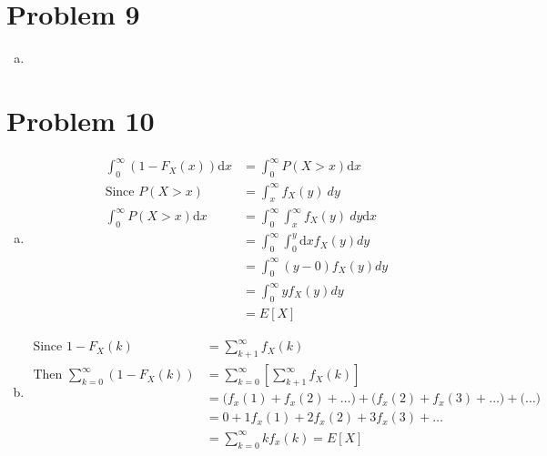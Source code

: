 \documentclass{article}
\newcommand{\dx}{\mathrm{d}x}
\begin{document}
\begin{flushleft}
\section*{Problem 9}
\begin{enumerate}[(a)]
\item 

\end{enumerate}
\section*{Problem 10}
\begin{enumerate}[(a)]
\item 
\begin{align*}
\int_{0}^{\infty}(1-F_X(x))\dx &=\int_{0}^{\infty}P(X>x)\dx\\
\text{Since }  P(X>x)&= \int_{x}^{\infty}f_X(y) \ dy\\
\int_{0}^{\infty}P(X>x)\dx&=\int_{0}^{\infty}\int_{x}^{\infty}f_X(y) \ dy \dx\\
&=\int_{0}^{\infty}\int_{0}^{y}\dx f_X(y) dy\\
&=\int_{0}^{\infty}(y-0)f_X(y)dy\\
&=\int_{0}^{\infty}yf_X(y)dy\\
&=E[X]
\end{align*}
\item 
\begin{align*}
\text{Since } 1-F_X(k)&=\sum_{k+1}^{\infty}f_X(k)\\
\text{Then }
\sum_{k=0}^{\infty}(1-F_X(k))&=\sum_{k=0}^{\infty}\left[\sum_{k+1}^{\infty}f_X(k)\right]\\
&=\bigg(f_x(1)+f_x(2)+\dots\bigg)+\bigg(f_x(2)+f_x(3)+\dots\bigg)+\bigg(\dots \bigg)\\
&=0+1f_x(1)+2f_x(2)+3f_x(3)+\dots\\
&=\sum_{k=0}^{\infty}kf_x(k)=E[X]
\end{align*}
\end{enumerate}
\pagebreak

\end{flushleft}
\end{document}
